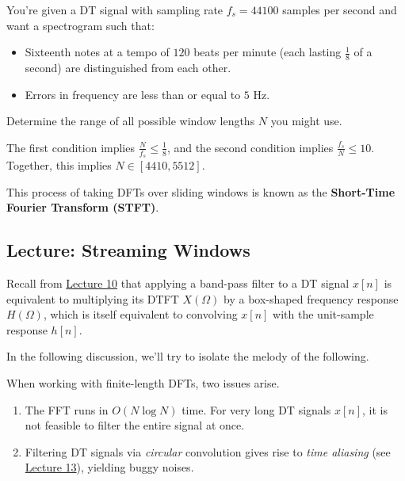 \begin{problem}
    You're given a DT signal with sampling rate
    $f_s = 44100$ samples per second and want a spectrogram such that:
    \begin{itemize}
        \item Sixteenth notes at a tempo of $120$ beats per minute
        (each lasting $\frac{1}{8}$ of a second)
        are distinguished from each other.
        \item Errors in frequency are less than or equal to $5$ Hz.
    \end{itemize}
    Determine the range of all possible window lengths $N$ you might use.
\end{problem}

\begin{solution}
    The first condition implies $\frac{N}{f_s} \leq \frac{1}{8}$,
    and the second condition implies $\frac{f_s}{N} \leq 10$.
    Together, this implies $N \in [4410, 5512]$.
\end{solution}

This process of taking DFTs over sliding windows
is known as the \textbf{Short-Time Fourier Transform (STFT)}.

\subsection{Lecture: Streaming Windows}

Recall from \href{/6.300/lectures/10/#recitation-filter-types}{Lecture 10} that
applying a band-pass filter to a DT signal $x[n]$
is equivalent to multiplying its DTFT $X(\Omega)$ by
a box-shaped frequency response $H(\Omega)$,
which is itself equivalent to convolving
$x[n]$ with the unit-sample response $h[n]$.

In the following discussion,
we'll try to isolate the melody of the following.


When working with finite-length DFTs,
two issues arise.
\begin{enumerate}
    \item The FFT runs in $O(N \log N)$ time.
    For very long DT signals $x[n]$,
    it is not feasible to filter the entire signal at once.
    \item Filtering DT signals via \emph{circular} convolution
    gives rise to \emph{time aliasing}
    (see \href{/6.300/lectures/13/#lecture-and-recitation-circular-convolution}{Lecture 13}),
    yielding buggy noises.
\end{enumerate}

